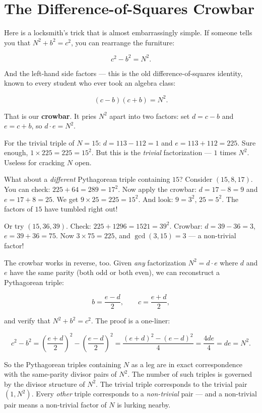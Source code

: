 \ornbreak



\section{The Difference-of-Squares Crowbar}


Here is a locksmith's trick that is almost embarrassingly simple. If someone tells you that $N^2 + b^2 = c^2$, you can rearrange the furniture:

\[
c^2 - b^2 = N^2.
\]

And the left-hand side factors --- this is the old difference-of-squares identity, known to every student who ever took an algebra class:

\[
(c - b)(c + b) = N^2.
\]

That is our \textbf{crowbar}. It pries $N^2$ apart into two factors: set $d = c - b$ and $e = c + b$, so $d \cdot e = N^2$.

For the trivial triple of $N = 15$: $d = 113 - 112 = 1$ and $e = 113 + 112 = 225$. Sure enough, $1 \times 225 = 225 = 15^2$. But this is the \textit{trivial} factorization --- $1$ times $N^2$. Useless for cracking $N$ open.

What about a \textit{different} Pythagorean triple containing $15$? Consider $(15, 8, 17)$. You can check: $225 + 64 = 289 = 17^2$. Now apply the crowbar: $d = 17 - 8 = 9$ and $e = 17 + 8 = 25$. We get $9 \times 25 = 225 = 15^2$. And look: $9 = 3^2$, $25 = 5^2$. The factors of $15$ have tumbled right out!

Or try $(15, 36, 39)$. Check: $225 + 1296 = 1521 = 39^2$. Crowbar: $d = 39 - 36 = 3$, $e = 39 + 36 = 75$. Now $3 \times 75 = 225$, and $\gcd(3, 15) = 3$ --- a non-trivial factor!

The crowbar works in reverse, too. Given \textit{any} factorization $N^2 = d \cdot e$ where $d$ and $e$ have the same parity (both odd or both even), we can reconstruct a Pythagorean triple:

\[
b = \frac{e - d}{2}, \qquad c = \frac{e + d}{2},
\]

and verify that $N^2 + b^2 = c^2$. The proof is a one-liner:

\[
c^2 - b^2 = \left(\frac{e+d}{2}\right)^{\!2} - \left(\frac{e-d}{2}\right)^{\!2} = \frac{(e+d)^2 - (e-d)^2}{4} = \frac{4de}{4} = de = N^2.
\]

So the Pythagorean triples containing $N$ as a leg are in exact correspondence with the same-parity divisor pairs of $N^2$. The number of such triples is governed by the divisor structure of $N^2$. The trivial triple corresponds to the trivial pair $(1, N^2)$. Every \textit{other} triple corresponds to a \textit{non-trivial} pair --- and a non-trivial pair means a non-trivial factor of $N$ is lurking nearby.

